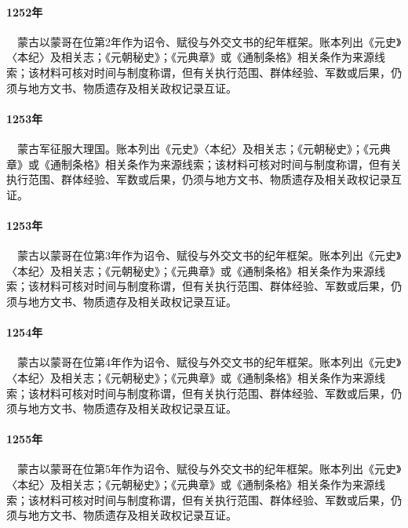 \paragraph{1252年}　蒙古以蒙哥在位第2年作为诏令、赋役与外交文书的纪年框架。账本列出《元史》〈本纪〉及相关志；《元朝秘史》；《元典章》或《通制条格》相关条作为来源线索；该材料可核对时间与制度称谓，但有关执行范围、群体经验、军数或后果，仍须与地方文书、物质遗存及相关政权记录互证。

\paragraph{1253年}　蒙古军征服大理国。账本列出《元史》〈本纪〉及相关志；《元朝秘史》；《元典章》或《通制条格》相关条作为来源线索；该材料可核对时间与制度称谓，但有关执行范围、群体经验、军数或后果，仍须与地方文书、物质遗存及相关政权记录互证。

\paragraph{1253年}　蒙古以蒙哥在位第3年作为诏令、赋役与外交文书的纪年框架。账本列出《元史》〈本纪〉及相关志；《元朝秘史》；《元典章》或《通制条格》相关条作为来源线索；该材料可核对时间与制度称谓，但有关执行范围、群体经验、军数或后果，仍须与地方文书、物质遗存及相关政权记录互证。

\paragraph{1254年}　蒙古以蒙哥在位第4年作为诏令、赋役与外交文书的纪年框架。账本列出《元史》〈本纪〉及相关志；《元朝秘史》；《元典章》或《通制条格》相关条作为来源线索；该材料可核对时间与制度称谓，但有关执行范围、群体经验、军数或后果，仍须与地方文书、物质遗存及相关政权记录互证。

\paragraph{1255年}　蒙古以蒙哥在位第5年作为诏令、赋役与外交文书的纪年框架。账本列出《元史》〈本纪〉及相关志；《元朝秘史》；《元典章》或《通制条格》相关条作为来源线索；该材料可核对时间与制度称谓，但有关执行范围、群体经验、军数或后果，仍须与地方文书、物质遗存及相关政权记录互证。

